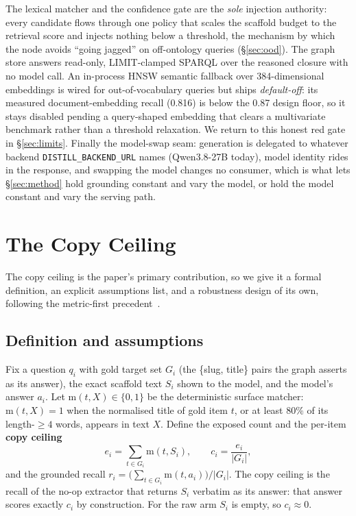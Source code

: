 \documentclass[10pt,twocolumn]{article}
\begin{document}
The lexical matcher and the confidence gate are the \emph{sole} injection authority: every
candidate flows through one policy that scales the scaffold budget to the retrieval score and
injects nothing below a threshold, the mechanism by which the node avoids ``going jagged'' on
off-ontology queries (\S\ref{sec:ood}). The graph store answers read-only, LIMIT-clamped SPARQL over
the reasoned closure with no model call. An in-process HNSW semantic fallback over 384-dimensional
embeddings is wired for out-of-vocabulary queries but ships \emph{default-off}: its measured
document-embedding recall (0.816) is below the 0.87 design floor, so it stays disabled pending a
query-shaped embedding that clears a multivariate benchmark rather than a threshold relaxation. We
return to this honest red gate in \S\ref{sec:limits}. Finally the model-swap seam: generation is
delegated to whatever backend \texttt{DISTILL\_BACKEND\_URL} names (Qwen3.8-27B today), model
identity rides in the response, and swapping the model changes no consumer, which is what lets
\S\ref{sec:method} hold grounding constant and vary the model, or hold the model constant and vary
the serving path.

\section{The Copy Ceiling}\label{sec:ceiling}
The copy ceiling is the paper's primary contribution, so we give it a formal definition, an
explicit assumptions list, and a robustness design of its own, following the metric-first
precedent~\cite{min2023factscore,gao2023alce}.

\subsection{Definition and assumptions}
Fix a question $q_i$ with gold target set $G_i$ (the \{slug, title\} pairs the graph asserts as its
answer), the exact scaffold text $S_i$ shown to the model, and the model's answer $a_i$. Let
$\mathrm{m}(t,X)\in\{0,1\}$ be the deterministic surface matcher: $\mathrm{m}(t,X)=1$ when the
normalised title of gold item $t$, or at least $80\%$ of its length-$\geq4$ words, appears in text
$X$. Define the exposed count and the per-item \textbf{copy ceiling}
\[
  e_i=\sum_{t\in G_i}\mathrm{m}(t,S_i),\qquad
  c_i=\frac{e_i}{|G_i|},
\]
and the grounded recall $r_i=\bigl(\sum_{t\in G_i}\mathrm{m}(t,a_i)\bigr)/|G_i|$. The copy ceiling
is the recall of the no-op extractor that returns $S_i$ verbatim as its answer: that answer scores
exactly $c_i$ by construction. For the raw arm $S_i$ is empty, so $c_i\approx0$.
\end{document}
